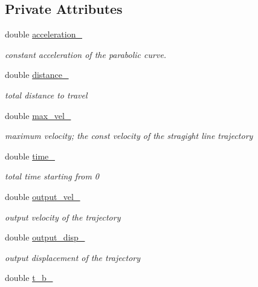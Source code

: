 \subsection*{Private Attributes}
\begin{DoxyCompactItemize}
\item 
double \hyperlink{classnubot_1_1ParaTrajPlanning_a10b79c4418036406d7fa1b897372c3a2}{acceleration\-\_\-}
\begin{DoxyCompactList}\small\item\em constant acceleration of the parabolic curve. \end{DoxyCompactList}\item 
double \hyperlink{classnubot_1_1ParaTrajPlanning_a2c2401906a5ad585d91bedb46261302a}{distance\-\_\-}
\begin{DoxyCompactList}\small\item\em total distance to travel \end{DoxyCompactList}\item 
double \hyperlink{classnubot_1_1ParaTrajPlanning_a28df46426852cc6627549f800512d8cf}{max\-\_\-vel\-\_\-}
\begin{DoxyCompactList}\small\item\em maximum velocity; the const velocity of the stragight line trajectory \end{DoxyCompactList}\item 
double \hyperlink{classnubot_1_1ParaTrajPlanning_a1cca952be3e779a2276db9e9341f4c80}{time\-\_\-}
\begin{DoxyCompactList}\small\item\em total time starting from 0 \end{DoxyCompactList}\item 
double \hyperlink{classnubot_1_1ParaTrajPlanning_a3a7a57f2f03c1a13b30a4368561cf048}{output\-\_\-vel\-\_\-}
\begin{DoxyCompactList}\small\item\em output velocity of the trajectory \end{DoxyCompactList}\item 
double \hyperlink{classnubot_1_1ParaTrajPlanning_a7cb561e9f25a00ef8a2589addcf7bbf8}{output\-\_\-disp\-\_\-}
\begin{DoxyCompactList}\small\item\em output displacement of the trajectory \end{DoxyCompactList}\item 
double \hyperlink{classnubot_1_1ParaTrajPlanning_a88e449b3208fe20c0a3dc4e94a02e618}{t\-\_\-b\-\_\-}

\end{DoxyCompactItemize}
